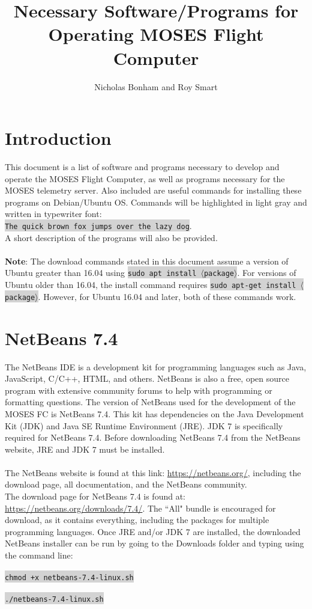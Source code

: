 \documentclass[11pt,a4paper,titlepage]{article}
\author{Nicholas Bonham and Roy Smart}
\title{Necessary Software/Programs for Operating MOSES Flight Computer}
\begin{document}
	\maketitle
	
	\tableofcontents
	
	\newpage
	\section{Introduction}
	This document is a list of software and programs necessary to develop and operate the MOSES Flight Computer, as well as programs necessary for the MOSES telemetry server. Also included are useful commands for installing these programs on Debian/Ubuntu OS. Commands will be highlighted in light gray and written in typewriter font: \\ \colorbox{lightgray}{\texttt{The quick brown fox jumps over the lazy dog}}. \\ A short description of the programs will also be provided.\\ \\
	\textbf{Note}: The download commands stated in this document assume a version of Ubuntu greater than 16.04 using \colorbox{lightgray}{\texttt{sudo apt install $\langle$package$\rangle$}}. For versions of Ubuntu older than 16.04, the install command requires \colorbox{lightgray}{\texttt{sudo apt-get install $\langle$package$\rangle$}}. However, for Ubuntu 16.04 and later, both of these commands work.
	
	\section{NetBeans 7.4}
	The NetBeans IDE is a development kit for programming languages such as Java, JavaScript, C/C++, HTML, and others. NetBeans is also a free, open source program with extensive community forums to help with programming or formatting questions. The version of NetBeans used for the development of the MOSES FC is NetBeans 7.4. This kit has dependencies on the Java Development Kit (JDK) and Java SE Runtime Environment (JRE). JDK 7 is specifically required for NetBeans 7.4. Before downloading NetBeans 7.4 from the NetBeans website, JRE and JDK 7 must be installed. \\
	\\
	The NetBeans website is found at this link: \url{https://netbeans.org/}, including the download page, all documentation, and the NetBeans community. \\ 
	The download page for NetBeans 7.4 is found at: \url{https://netbeans.org/downloads/7.4/}. The ``All" bundle is encouraged for download, as it contains everything, including the packages for multiple programming languages. Once JRE and/or JDK 7 are installed, the downloaded NetBeans installer can be run by going to the Downloads folder and typing using the command line: \\
	\\
	\colorbox{lightgray}{\texttt{chmod +x netbeans-7.4-linux.sh}} \\
	\\
	\colorbox{lightgray}{\texttt{./netbeans-7.4-linux.sh}}
	
\end{document}
